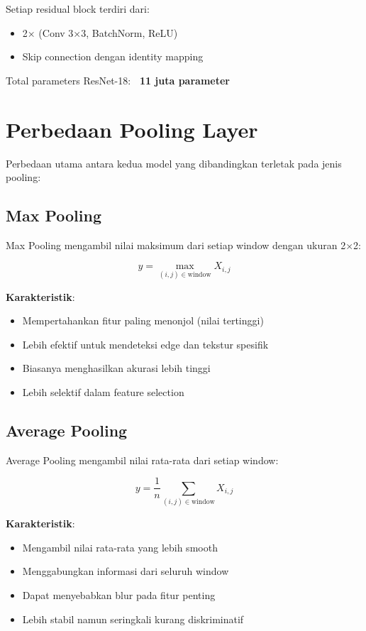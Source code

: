 \documentclass[12pt,a4paper]{report}
\begin{document}
Setiap residual block terdiri dari:
\begin{itemize}
    \item 2× (Conv 3×3, BatchNorm, ReLU)
    \item Skip connection dengan identity mapping
\end{itemize}

Total parameters ResNet-18: \textbf{~11 juta parameter}

\section{Perbedaan Pooling Layer}

Perbedaan utama antara kedua model yang dibandingkan terletak pada jenis pooling:

\subsection{Max Pooling}

Max Pooling mengambil nilai maksimum dari setiap window dengan ukuran 2×2:

\begin{equation}
    y = \max_{(i,j) \in \text{window}} X_{i,j}
\end{equation}

\textbf{Karakteristik}:
\begin{itemize}
    \item Mempertahankan fitur paling menonjol (nilai tertinggi)
    \item Lebih efektif untuk mendeteksi edge dan tekstur spesifik
    \item Biasanya menghasilkan akurasi lebih tinggi
    \item Lebih selektif dalam feature selection
\end{itemize}

\subsection{Average Pooling}

Average Pooling mengambil nilai rata-rata dari setiap window:

\begin{equation}
    y = \frac{1}{n} \sum_{(i,j) \in \text{window}} X_{i,j}
\end{equation}

\textbf{Karakteristik}:
\begin{itemize}
    \item Mengambil nilai rata-rata yang lebih smooth
    \item Menggabungkan informasi dari seluruh window
    \item Dapat menyebabkan blur pada fitur penting
    \item Lebih stabil namun seringkali kurang diskriminatif
\end{itemize}
\end{document}
